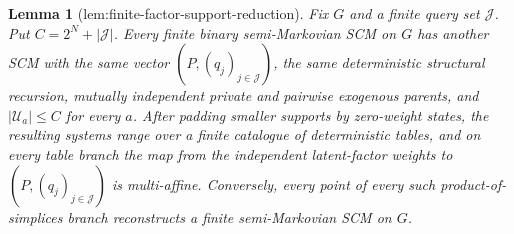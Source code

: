 \documentclass{article}
\newtheorem{lemma}{Lemma}
\begin{document}
\begin{lemma}[lem:finite-factor-support-reduction]\label{lem:finite-factor-support-reduction}
Fix \(G\) and a finite query set \(\mathcal J\).  Put \(C=2^N+|\mathcal J|\).  Every finite binary semi-Markovian SCM on \(G\) has another SCM with the same vector \((P,(q_j)_{j\in\mathcal J})\), the same deterministic structural recursion, mutually independent private and pairwise exogenous parents, and \(|\mathcal U_a|\le C\) for every \(a\).  After padding smaller supports by zero-weight states, the resulting systems range over a finite catalogue of deterministic tables, and on every table branch the map from the independent latent-factor weights to \((P,(q_j)_{j\in\mathcal J})\) is multi-affine.  Conversely, every point of every such product-of-simplices branch reconstructs a finite semi-Markovian SCM on \(G\).
\end{lemma}
\end{document}
